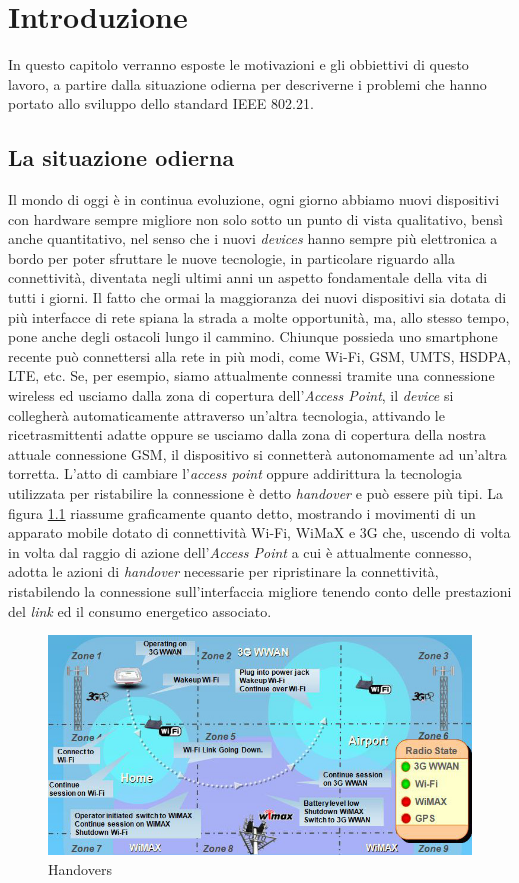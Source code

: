 \chapter{Introduzione}
In questo capitolo verranno esposte le motivazioni e gli obbiettivi di questo lavoro, a partire dalla situazione odierna per descriverne i problemi che hanno portato allo sviluppo dello standard IEEE 802.21.

\section{La situazione odierna}
Il mondo di oggi è in continua evoluzione, ogni giorno abbiamo nuovi dispositivi con hardware sempre migliore non solo sotto un punto di vista qualitativo, bensì anche quantitativo, nel senso che i nuovi {\em devices} hanno sempre più elettronica a bordo per poter sfruttare le nuove tecnologie, in particolare riguardo alla connettività, diventata negli ultimi anni un aspetto fondamentale della vita di tutti i giorni. Il fatto che ormai la maggioranza dei nuovi dispositivi sia dotata di più interfacce di rete spiana la strada a molte opportunità, ma, allo stesso tempo, pone anche degli ostacoli lungo il cammino.
Chiunque possieda uno smartphone recente può connettersi alla rete in più modi, come Wi-Fi, GSM, UMTS, HSDPA, LTE, etc. Se, per esempio, siamo attualmente connessi tramite una connessione wireless ed usciamo dalla zona di copertura dell'{\em Access Point}, il {\em device} si collegherà automaticamente attraverso un'altra tecnologia, attivando le ricetrasmittenti adatte oppure se usciamo dalla zona di copertura della nostra attuale connessione GSM, il dispositivo si connetterà autonomamente ad un'altra torretta. L'atto di cambiare l'{\em access point} oppure addirittura la tecnologia utilizzata per ristabilire la connessione è detto {\em handover} e può essere più tipi. La figura \ref{fig:handovers} riassume graficamente quanto detto, mostrando i movimenti di un apparato mobile dotato di connettività Wi-Fi, WiMaX e 3G che, uscendo di volta in volta dal raggio di azione dell'{\em Access Point} a cui è attualmente connesso, adotta le azioni di {\em handover} necessarie per ripristinare la connettività, ristabilendo la connessione sull'interfaccia migliore tenendo conto delle prestazioni del {\em link} ed il consumo energetico associato.

\begin{figure}[h!]
\centering
\includegraphics[scale=0.55]{handovers.jpg}
\caption{Handovers}
\label{fig:handovers}
\end{figure}

